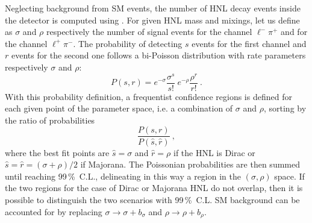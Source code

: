 Neglecting background from SM events, the number of HNL decay events inside the detector is computed %
using .
For given HNL mass and mixings, let us define as $\sigma$ and $\rho$ respectively %
the number of signal events for the channel $\ell^- \pi^+$ and for the channel $\ell^+ \pi^-$.
The probability of detecting $s$ events for the first channel and $r$ events for the second one %
follows a bi-Poisson distribution with rate parameters respectively $\sigma$ and $\rho$:
\begin{equation}
	P(s, r) = e^{-\sigma} \frac{\sigma^s}{s!}\ e^{-\rho} \frac{\rho^r}{r!}\ .
\end{equation}
With this probability definition, a frequentist confidence regions is defined %
for each given point of the parameter space, i.e. a combination of $\sigma$ and $\rho$, %
sorting by the ratio of probabilities~\cite{Feldman:1997qc} %
\begin{equation}
	\frac{P(s, r)}{P(\hat{s}, \hat{r})}\ ,
\end{equation}
where the best fit points are $\hat{s} = \sigma$ and $\hat{r} = \rho$ if the HNL is Dirac %
or $\hat{s} = \hat{r} = (\sigma + \rho)/2$ if Majorana.
The Poissonian probabilities are then summed until reaching 99\,\%\ C.L., %
delineating in this way a region in the $(\sigma, \rho)$ space.
If the two regions for the case of Dirac or Majorana HNL do not overlap, %
then it is possible to distinguish the two scenarios with 99\,\%\ C.L.
SM background can be accounted for by replacing $\sigma \to \sigma + b_\sigma$ and $\rho \to \rho + b_\rho$.

